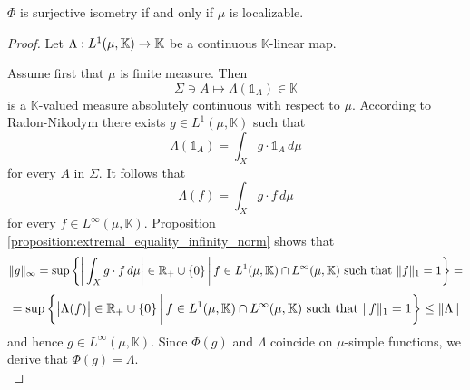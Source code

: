 \begin{theorem}\label{theorem:dual_to_L_1_surjective_isometry}
  $\Phi$ is surjective isometry if and only if $\mu$ is localizable.
\end{theorem}
\begin{proof}
  Let $\Lambda:L^1(\mu,\mathbb{K})\rightarrow \mathbb{K}$ be a continuous $\mathbb{K}$-linear map. 
  
  Assume first that $\mu$ is finite measure. Then
  $$\Sigma \ni A \mapsto \Lambda(\mathbb{1}_A) \in \mathbb{K}$$
  is a $\mathbb{K}$-valued measure absolutely continuous with respect to $\mu$. According to Radon-Nikodym there exists $g \in L^1(\mu,\mathbb{K})$ such that
  $$\Lambda\left(\mathbb{1}_A\right) = \int_Xg\cdot \mathbb{1}_A\,d\mu$$
  for every $A$ in $\Sigma$. It follows that
  $$\Lambda(f) = \int_Xg\cdot f\,d\mu$$
  for every $f \in L^{\infty}(\mu,\mathbb{K})$. Proposition \ref{proposition:extremal_equality_infinity_norm} shows that
  $$\lVert g \rVert_{\infty} =\sup \bigg\{\bigg|\int_Xg\cdot f\,d\mu\bigg|\in {\mathbb R}_+\cup \{0\}\,\bigg|\,f \in L^1(\mu,\mathbb{K})\cap L^{\infty}(\mu,\mathbb{K})\mbox{ such that }\lVert f\rVert_1 = 1\bigg\} = $$
  $$= \sup \bigg\{\big|\Lambda(f)\big|\in {\mathbb R}_+\cup \{0\}\,\bigg|\,f \in L^1(\mu,\mathbb{K})\cap L^{\infty}(\mu,\mathbb{K})\mbox{ such that }\lVert f\rVert_1 = 1\bigg\} \leq \lVert \Lambda \rVert$$
  and hence $g \in L^{\infty}(\mu,\mathbb{K})$. Since $\Phi(g)$ and $\Lambda$ coincide on $\mu$-simple functions, we derive that $\Phi(g) = \Lambda$.\\


\end{proof}
